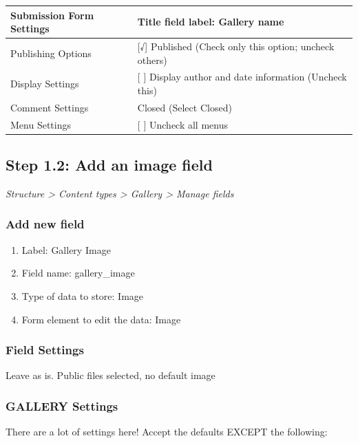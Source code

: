 \documentclass[letterpaper,10pt,english]{sphinxmanual}
\begin{document}
\begin{tabulary}{\linewidth}{|L|L|}
\hline

Submission Form Settings
 & 
Title field label: Gallery name
\\\hline

Publishing Options
 & 
{[}√{]} Published (Check only this option; uncheck others)
\\\hline

Display Settings
 & 
{[}  {]} Display author and date information (Uncheck this)
\\\hline

Comment Settings
 & 
Closed (Select Closed)
\\\hline

Menu Settings
 & 
{[}  {]} Uncheck all menus
\\\hline
\end{tabulary}



\subsection{Step 1.2: Add an image field}
\label{recipe:step-1-2-add-an-image-field}
\emph{Structure \textgreater{} Content types \textgreater{} Gallery \textgreater{} Manage fields}


\subsubsection{Add new field}
\label{recipe:add-new-field}\begin{enumerate}
\item {} 
Label: Gallery Image

\item {} 
Field name: gallery\_image

\item {} 
Type of data to store: Image

\item {} 
Form element to edit the data: Image

\end{enumerate}


\subsubsection{Field Settings}
\label{recipe:field-settings}
Leave as is. Public files selected, no default image


\subsubsection{GALLERY Settings}
\label{recipe:gallery-settings}
There are a lot of settings here! Accept the defaults EXCEPT the following:
\end{document}
